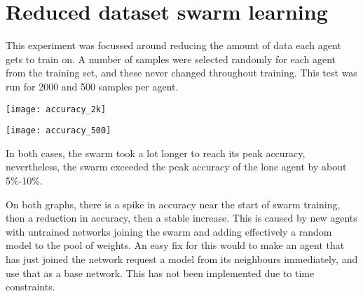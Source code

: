 \section{Reduced dataset swarm learning}
This experiment was focussed around reducing the amount of data each agent gets to train on. A number of samples were selected randomly for each agent from the training set, and these never changed throughout training. This test was run for 2000 and 500 samples per agent.

\texttt{[image: accuracy\_2k]}

\texttt{[image: accuracy\_500]}

In both cases, the swarm took a lot longer to reach its peak accuracy, nevertheless, the swarm exceeded the peak accuracy of the lone agent by about 5\%-10\%.

On both graphs, there is a spike in accuracy near the start of swarm training, then a reduction in accuracy, then a stable increase. This is caused by new agents with untrained networks joining the swarm and adding effectively a random model to the pool of weights. An easy fix for this would to make an agent that has just joined the network request a model from its neighbours immediately, and use that as a base network. This has not been implemented due to time constraints. 